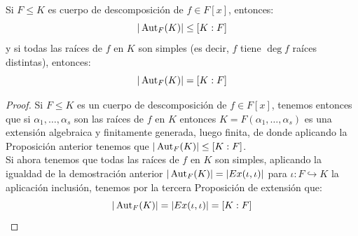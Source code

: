\begin{prop}\label{prop:cuerpo_desc_aut_f_lin}
    Si $F\leq K$ es cuerpo de descomposición de $f\in F[x]$, entonces: 
    \begin{equation*}
        |\operatorname{Aut}_F(K)| \leq [K:F]
    \end{equation*}
    y si todas las raíces de $f$ en $K$ son simples (es decir, $f$ tiene $\deg f$ raíces distintas), entonces:
    \begin{equation*}
        |\operatorname{Aut}_F(K)| = [K:F]
    \end{equation*}
    \begin{proof}
        Si $F\leq K$ es un cuerpo de descomposición de $f\in F[x]$, tenemos entonces que si $\alpha_1, \ldots, \alpha_s$ son las raíces de $f$ en $K$ entonces $K = F(\alpha_1, \ldots, \alpha_s)$ es una extensión algebraica y finitamente generada, luego finita, de donde aplicando la Proposición anterior tenemos que $|\operatorname{Aut}_F(K)|\leq [K:F]$.\\

        \noindent
        Si ahora tenemos que todas las raíces de $f$ en $K$ son simples, aplicando la igualdad de la demostración anterior $|\operatorname{Aut}_F(K)| = |Ex(\iota,\iota)|$ para $\iota:F\hookrightarrow K$ la aplicación inclusión, tenemos por la tercera Proposición de extensión que:
        \begin{equation*}
            |\operatorname{Aut}_F(K)| = |Ex(\iota,\iota)| = [K:F]
        \end{equation*}
    \end{proof}
\end{prop}

